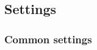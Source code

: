\documentclass{vldb}
\begin{document}


\subsection{Settings}

\subsubsection{Common settings}
\label{subsubsec:commonSettings}
\end{document}
